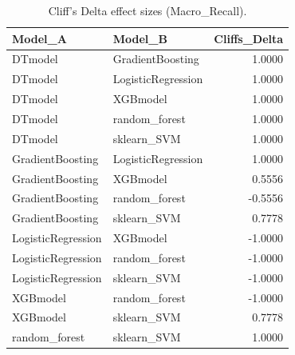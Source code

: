 \begin{table}[t]
\centering
\begin{tabular}{llr}
\toprule
Model_A & Model_B & Cliffs_Delta \\
\midrule
DTmodel & GradientBoosting & 1.0000 \\
DTmodel & LogisticRegression & 1.0000 \\
DTmodel & XGBmodel & 1.0000 \\
DTmodel & random_forest & 1.0000 \\
DTmodel & sklearn_SVM & 1.0000 \\
GradientBoosting & LogisticRegression & 1.0000 \\
GradientBoosting & XGBmodel & 0.5556 \\
GradientBoosting & random_forest & -0.5556 \\
GradientBoosting & sklearn_SVM & 0.7778 \\
LogisticRegression & XGBmodel & -1.0000 \\
LogisticRegression & random_forest & -1.0000 \\
LogisticRegression & sklearn_SVM & -1.0000 \\
XGBmodel & random_forest & -1.0000 \\
XGBmodel & sklearn_SVM & 0.7778 \\
random_forest & sklearn_SVM & 1.0000 \\
\bottomrule
\end{tabular}
\caption{Cliff's Delta effect sizes (Macro_Recall).}
\label{tab:cliffs_Macro_Recall}
\end{table}